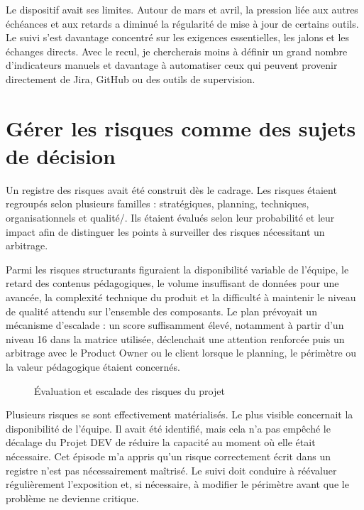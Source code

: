 Le dispositif avait ses limites. Autour de mars et avril, la pression liée aux autres échéances et aux retards a diminué la régularité de mise à jour de certains outils. Le suivi s'est davantage concentré sur les exigences essentielles, les jalons et les échanges directs. Avec le recul, je chercherais moins à définir un grand nombre d'indicateurs manuels et davantage à automatiser ceux qui peuvent provenir directement de Jira, GitHub ou des outils de supervision.

\section{Gérer les risques comme des sujets de décision}

Un registre des risques avait été construit dès le cadrage. Les risques étaient regroupés selon plusieurs familles : stratégiques, planning, techniques, organisationnels et qualité/. Ils étaient évalués selon leur probabilité et leur impact afin de distinguer les points à surveiller des risques nécessitant un arbitrage.

Parmi les risques structurants figuraient la disponibilité variable de l'équipe, le retard des contenus pédagogiques, le volume insuffisant de données pour une  avancée, la complexité technique du produit et la difficulté à maintenir le niveau de qualité attendu sur l'ensemble des composants. Le plan prévoyait un mécanisme d'escalade : un score suffisamment élevé, notamment à partir d'un niveau 16 dans la matrice utilisée, déclenchait une attention renforcée puis un arbitrage avec le Product Owner ou le client lorsque le planning, le périmètre ou la valeur pédagogique étaient concernés.

\begin{figure}[H]
\centering
{}
\caption{Évaluation et escalade des risques du projet}
\label{fig:lynx-risques}
\end{figure}

Plusieurs risques se sont effectivement matérialisés. Le plus visible concernait la disponibilité de l'équipe. Il avait été identifié, mais cela n'a pas empêché le décalage du Projet DEV de réduire la capacité au moment où elle était nécessaire. Cet épisode m'a appris qu'un risque correctement écrit dans un registre n'est pas nécessairement maîtrisé. Le suivi doit conduire à réévaluer régulièrement l'exposition et, si nécessaire, à modifier le périmètre avant que le problème ne devienne critique.


